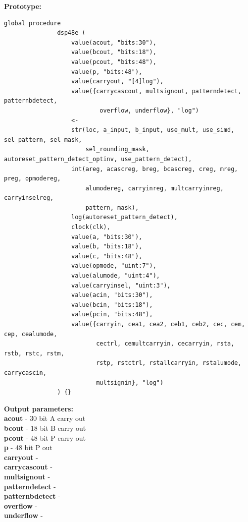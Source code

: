             {\bf Prototype:} \\
            \vsp
            \begin{lstlisting}[gobble=12, language=threepl]
               global procedure
               dsp48e (
                   value(acout, "bits:30"),
                   value(bcout, "bits:18"),
                   value(pcout, "bits:48"),
                   value(p, "bits:48"),
                   value(carryout, "[4]log"),
                   value({carrycascout, multsignout, patterndetect, patternbdetect,
                           overflow, underflow}, "log")
                   <-   
                   str(loc, a_input, b_input, use_mult, use_simd, sel_pattern, sel_mask,
                       sel_rounding_mask, autoreset_pattern_detect_optinv, use_pattern_detect),
                   int(areg, acascreg, breg, bcascreg, creg, mreg, preg, opmodereg,
                       alumodereg, carryinreg, multcarryinreg, carryinselreg,
                       pattern, mask),
                   log(autoreset_pattern_detect),
                   clock(clk),
                   value(a, "bits:30"),
                   value(b, "bits:18"),
                   value(c, "bits:48"),
                   value(opmode, "uint:7"),
                   value(alumode, "uint:4"),
                   value(carryinsel, "uint:3"),
                   value(acin, "bits:30"),
                   value(bcin, "bits:18"),
                   value(pcin, "bits:48"),
                   value({carryin, cea1, cea2, ceb1, ceb2, cec, cem, cep, cealumode,
                          cectrl, cemultcarryin, cecarryin, rsta, rstb, rstc, rstm,
                          rstp, rstctrl, rstallcarryin, rstalumode, carrycascin,
                          multsignin}, "log")
               ) {}
            \end{lstlisting}

            {\bf Output parameters:} \\
            {\bf acout} - 30 bit A carry out   \\
            {\bf bcout} - 18 bit B carry out   \\
            {\bf pcout} - 48 bit P carry out  \\
            {\bf p} - 48 bit P out    \\
            {\bf carryout} -   \\
            {\bf carrycascout} -   \\
            {\bf multsignout} -   \\
            {\bf patterndetect} -   \\
            {\bf patternbdetect} -   \\
            {\bf overflow} -   \\
            {\bf underflow} -   \\

